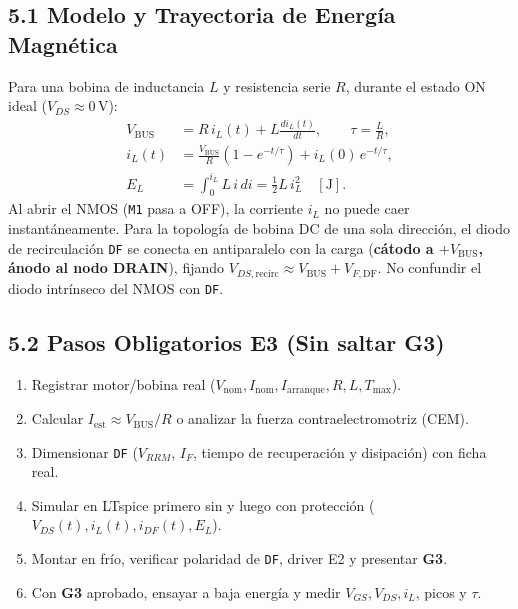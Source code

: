 \documentclass[10pt, a4paper, landscape]{article}
\begin{document}
\begin{minipage}[t]{0.54\linewidth}
\subsection*{5.1 Modelo y Trayectoria de Energía Magnética}
Para una bobina de inductancia $L$ y resistencia serie $R$, durante el estado ON ideal ($V_{DS} \approx 0\,\text{V}$):
\begin{align}
    V_{\text{BUS}} &= R\,i_L(t) + L\frac{di_L(t)}{dt}, \qquad \tau = \frac{L}{R}, \\
    i_L(t) &= \frac{V_{\text{BUS}}}{R}\left(1 - e^{-t/\tau}\right) + i_L(0)\,e^{-t/\tau}, \\
    E_L &= \int_0^{i_L} L\,i\,di = \frac{1}{2}L\,i_L^2 \quad [\text{J}].
\end{align}
Al abrir el NMOS (\texttt{M1} pasa a OFF), la corriente $i_L$ no puede caer instantáneamente. Para la topología de bobina DC de una sola dirección, el diodo de recirculación \texttt{DF} se conecta en antiparalelo con la carga (\textbf{cátodo a $+V_{\text{BUS}}$, ánodo al nodo DRAIN}), fijando $V_{DS,\text{recirc}} \approx V_{\text{BUS}} + V_{F,\text{DF}}$. No confundir el diodo intrínseco del NMOS con \texttt{DF}.

\subsection*{5.2 Pasos Obligatorios E3 (Sin saltar G3)}
\begin{enumerate}[noitemsep, topsep=2pt]
    \item Registrar motor/bobina real ($V_{\text{nom}}, I_{\text{nom}}, I_{\text{arranque}}, R, L, T_{\max}$).
    \item Calcular $I_{\text{est}} \approx V_{\text{BUS}}/R$ o analizar la fuerza contraelectromotriz (CEM).
    \item Dimensionar \texttt{DF} ($V_{RRM}$, $I_F$, tiempo de recuperación y disipación) con ficha real.
    \item Simular en LTspice primero sin y luego con protección ($V_{DS}(t), i_L(t), i_{DF}(t), E_L$).
    \item Montar en frío, verificar polaridad de \texttt{DF}, driver E2 y presentar \textbf{G3}.
    \item Con \textbf{G3} aprobado, ensayar a baja energía y medir $V_{GS}, V_{DS}, i_L$, picos y $\tau$.
\end{enumerate}
\end{minipage}\hfill
\end{document}
